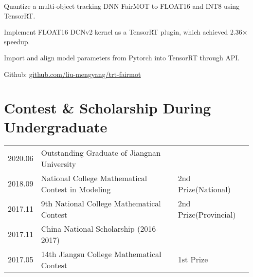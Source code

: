 \documentclass[]{deedy-resume-openfont}
\begin{document}
\begin{minipage}[t]{0.77\textwidth}
\begin{tightemize}
    \item Quantize a multi-object tracking DNN FairMOT to FLOAT16 and INT8 using TensorRT.
    \item Implement FLOAT16 DCNv2 kernel as a TensorRT plugin, which achieved 2.36$\times$ speedup.
    \item Import and align model parameters from Pytorch into TensorRT through API.
    \item Github: \href{https://github.com/liu-mengyang/trt-fairmot}{github.com/liu-mengyang/trt-fairmot}
\end{tightemize}
\sectionsep

\section{Contest \& Scholarship During Undergraduate} 
\begin{tabular}{lll}
    2020.06 & Outstanding Graduate of Jiangnan University & \\
    2018.09 & National College Mathematical Contest in Modeling & 2nd Prize(National) \\
    2017.11 & 9th National College Mathematical Contest & 2nd Prize(Provincial) \\
    2017.11 & China National Scholarship (2016-2017) & \\
    2017.05 & 14th Jiangsu College Mathematical Contest & 1st Prize\\
\end{tabular}
\sectionsep

\end{minipage} 
\end{document}
